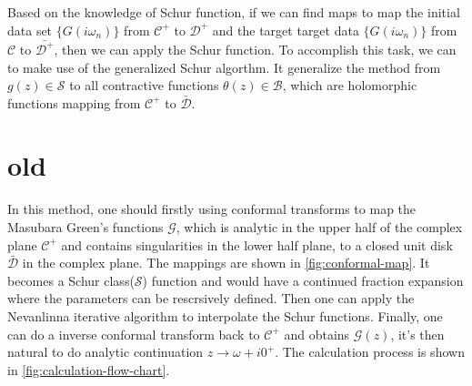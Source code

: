 \documentclass[
	preprint,%
	aps,
	prb,
	showpacs,	
	amsmath, amssymb]{revtex4-2}
\DeclareRobustCommand{\+}{\hstretch{1.25} {\boldsymbol {\mathrel{+}}}}
\newcommand{\C}{ {\mathcal{C}} }
\newcommand{\D}{ {\mathcal{D}} }
\newcommand{\Dbar}{ {\bar{\mathcal{D}}} }
\newcommand{\B}{ {\mathcal{B}} }
\begin{document}
Based on the knowledge of Schur function, if we can find maps 
to map the initial data set $\{ G(i\omega_n)\}$
from $\C^+$ to $\D^+$ and the target 
target data $\{ G(i\omega_n)\}$ from $\C$ to $\bar{\D^+}$, 
then we can apply the Schur function. 
To accomplish this task, we can to make use of the generalized 
Schur algorthm\cite{adamyan2003reconstruction}. It generalize the 
method from $g(z) \in \mathcal{S}$ to all contractive functions 
$\theta(z) \in \B$, which 
are holomorphic functions mapping from $\mathcal{C^+}$ 
to $\Dbar$.	









\section{old}



In this method, one should firstly using 
conformal transforms to map the Masubara Green's functions $\mathcal{G}$, 
which is analytic in the upper half of the complex plane $\C^+$ and 
contains singularities in the lower half plane, to a closed unit disk 
$\Dbar$ in the complex plane. The mappings are shown in \cref{fig:conformal-map}. 
It becomes a Schur class($\mathcal{S}$) 
function and would have a continued fraction expansion where the parameters 
can be rescrsively defined\cite{schur1918potenzreihen}. Then one can 
apply the Nevanlinna iterative algorithm to interpolate the Schur 
functions\cite{nevanlinna1919uber}.
Finally, one can do a inverse conformal transform back to $\C^+$ and 
obtains $\mathcal{G}(z)$, it's then natural to do analytic continuation 
$z \to \omega + i0^+$. The calculation process is shown in \cref{fig:calculation-flow-chart}.
\end{document}

